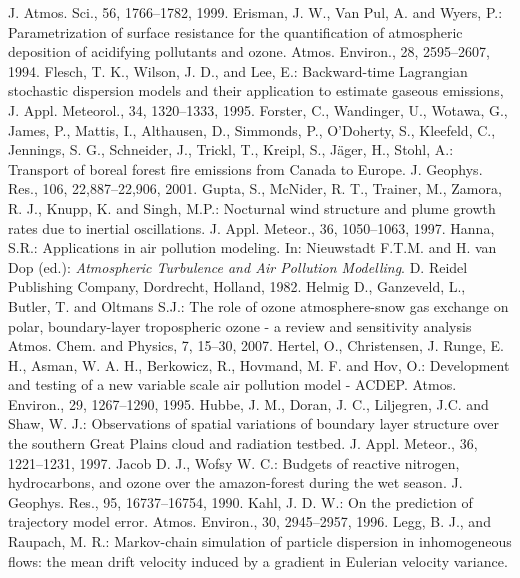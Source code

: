 \documentclass{egu}                  %
\begin{document}
\begin{thebibliography}{}
J. Atmos. Sci., 56, 1766--1782, 1999.
Erisman, J. W., Van Pul, A. and Wyers, P.:
Parametrization of surface resistance for the quantification of atmospheric deposition of acidifying pollutants and ozone.
Atmos. Environ., 28, 2595--2607, 1994.
Flesch, T. K., Wilson, J. D., and Lee, E.:
Backward-time Lagrangian stochastic dispersion models and their application to estimate gaseous emissions,
J. Appl. Meteorol., 34, 1320--1333, 1995.
Forster, C., Wandinger, U., Wotawa, G., James, P., Mattis, I., Althausen, D., Simmonds, P., O'Doherty, S., Kleefeld, C., Jennings, S. G., Schneider, J., Trickl, T., Kreipl, S., J\"ager, H., Stohl, A.:
Transport of boreal forest fire emissions from Canada to Europe.
J. Geophys. Res., 106, 22,887--22,906, 2001.
Gupta, S., McNider, R. T., Trainer, M., Zamora, R. J., Knupp, K. and Singh, M.P.:
Nocturnal wind structure and plume growth rates due to inertial oscillations.
J. Appl. Meteor., 36, 1050--1063, 1997.
Hanna, S.R.:
Applications in air pollution modeling. In: Nieuwstadt F.T.M. and H. van Dop (ed.): {\em Atmospheric Turbulence and Air Pollution Modelling}.
D. Reidel Publishing Company, Dordrecht, Holland, 1982.
Helmig D., Ganzeveld, L., Butler, T. and Oltmans S.J.: 
The role of ozone atmosphere-snow gas exchange on polar, boundary-layer tropospheric ozone - a review and sensitivity analysis 
Atmos. Chem. and Physics, 7, 15--30, 2007.
Hertel, O., Christensen, J. Runge, E. H., Asman, W. A. H., Berkowicz, R., Hovmand, M. F. and Hov, O.:
Development and testing of a new variable scale air pollution model - ACDEP.
Atmos. Environ., 29, 1267--1290, 1995.
Hubbe, J. M., Doran, J. C., Liljegren, J.C. and Shaw, W. J.:
Observations of spatial variations of boundary layer structure over the southern Great Plains cloud and radiation testbed.
J. Appl. Meteor., 36, 1221--1231, 1997.
Jacob D. J., Wofsy W. C.:
Budgets of reactive nitrogen, hydrocarbons, and ozone over the amazon-forest during the wet season. 
J. Geophys. Res., 95, 16737--16754, 1990. 
Kahl, J. D. W.:
On the prediction of trajectory model error.
Atmos. Environ., 30, 2945--2957, 1996.
Legg, B. J., and Raupach, M. R.:
Markov-chain simulation of particle dispersion in inhomogeneous flows: the mean drift velocity induced by a gradient in Eulerian velocity variance.

\end{thebibliography}
\end{document}
